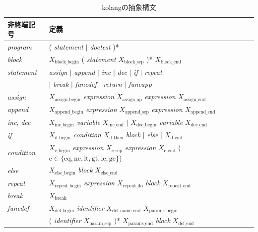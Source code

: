 \documentclass{ipsjprosym}
\begin{document}
\begin{table}[t]
\begin{small}
\caption{kolangの抽象構文}
\label{tab:kolang-bnf}
\centering
\begin{tabular}{l p{8cm}}
\hline
非終端記号 & 定義 \\
\hline
\textit{program}     & ( \textit{statement} $\mid$ \textit{doctest} )* \\
\textit{block}       & $X_{\mathrm{block\_begin}}$ ( \textit{statement} $X_{\mathrm{block\_sep}}$ )* $X_{\mathrm{block\_end}}$ \\
\textit{statement}   & \textit{assign} $\mid$ \textit{append} $\mid$ \textit{inc} $\mid$ \textit{dec} $\mid$ \textit{if} $\mid$ \textit{repeat} \\
                     & $\mid$ \textit{break} $\mid$ \textit{funcdef} $\mid$ \textit{return} $\mid$ \textit{funcapp} \\
\textit{assign}      & $X_{\mathrm{assign\_begin}}$ \textit{expression} $X_{\mathrm{assign\_op}}$ \textit{expression} $X_{\mathrm{assign\_end}}$ \\
\textit{append}      & $X_{\mathrm{append\_begin}}$ \textit{expression} $X_{\mathrm{append\_sep}}$ \textit{expression} $X_{\mathrm{append\_end}}$ \\
\textit{inc}, \textit{dec} & $X_{\mathrm{inc\_begin}}$ \textit{variable} $X_{\mathrm{inc\_end}}$ $\mid$ $X_{\mathrm{dec\_begin}}$ \textit{variable} $X_{\mathrm{dec\_end}}$ \\
\textit{if}          & $X_{\mathrm{if\_begin}}$ \textit{condition} $X_{\mathrm{if\_then}}$ \textit{block} [ \textit{else} ] $X_{\mathrm{if\_end}}$ \\
\textit{condition}   & $X_{\mathrm{c\_begin}}$ \textit{expression} $X_{\mathrm{c\_sep}}$ \textit{expression} $X_{\mathrm{c\_end}}$ \quad ($\mathrm{c} \in \{\mathrm{eq}, \mathrm{ne}, \mathrm{lt}, \mathrm{gt}, \mathrm{le}, \mathrm{ge}\}$) \\
\textit{else}        & $X_{\mathrm{else\_begin}}$ \textit{block} $X_{\mathrm{else\_end}}$ \\
\textit{repeat}      & $X_{\mathrm{repeat\_begin}}$ \textit{expression} $X_{\mathrm{repeat\_do}}$ \textit{block} $X_{\mathrm{repeat\_end}}$ \\
\textit{break}       & $X_{\mathrm{break}}$ \\
\textit{funcdef}     & $X_{\mathrm{def\_begin}}$ \textit{identifier} $X_{\mathrm{def\_name\_end}}$ $X_{\mathrm{params\_begin}}$ \\
                     & \quad ( \textit{identifier} $X_{\mathrm{param\_sep}}$ )* $X_{\mathrm{params\_end}}$ \textit{block} $X_{\mathrm{def\_end}}$ \\

\end{tabular}
\end{small}
\end{table}
\end{document}
